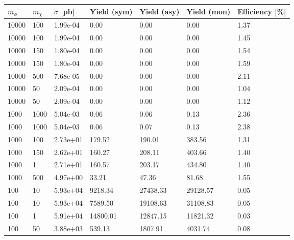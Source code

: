 \begin{table}
\small
\centering
\begin{tabular}{lllllll}
\hline
$m_\phi$ & $m_\chi$ & $\sigma$ [pb] & Yield (sym) & Yield (asy) & Yield (mon) & Efficiency [\%] \\ \hline
10000     &   100       &   1.99e-04  &   0.00      &   0.00      &   0.00      &   1.37      \\ 
10000     &   100       &   1.99e-04  &   0.00      &   0.00      &   0.00      &   1.45      \\ 
10000     &   150       &   1.80e-04  &   0.00      &   0.00      &   0.00      &   1.54      \\ 
10000     &   150       &   1.80e-04  &   0.00      &   0.00      &   0.00      &   1.59      \\ 
10000     &   500       &   7.68e-05  &   0.00      &   0.00      &   0.00      &   2.11      \\ 
10000     &   50        &   2.09e-04  &   0.00      &   0.00      &   0.00      &   1.04      \\ 
10000     &   50        &   2.09e-04  &   0.00      &   0.00      &   0.00      &   1.12      \\ 
1000      &   1000      &   5.04e-03  &   0.06      &   0.06      &   0.13      &   2.36      \\ 
1000      &   1000      &   5.04e-03  &   0.06      &   0.07      &   0.13      &   2.38      \\ 
1000      &   100       &   2.73e+01  &   179.52    &   190.01    &   383.56    &   1.31      \\ 
1000      &   150       &   2.62e+01  &   160.27    &   208.11    &   403.66    &   1.40      \\ 
1000      &   1         &   2.71e+01  &   160.57    &   203.17    &   434.80    &   1.40      \\ 
1000      &   500       &   4.97e+00  &   33.21     &   47.36     &   81.68     &   1.55      \\ 
100       &   10        &   5.93e+04  &   9218.34   &   27438.33  &   29128.57  &   0.05      \\ 
100       &   10        &   5.93e+04  &   7589.50   &   19108.63  &   31108.83  &   0.05      \\ 
100       &   1         &   5.91e+04  &   14800.01  &   12847.15  &   11821.32  &   0.03      \\ 
100       &   50        &   3.88e+03  &   539.13    &   1807.91   &   4031.74   &   0.08      \\ 

\end{tabular}
\end{table}
